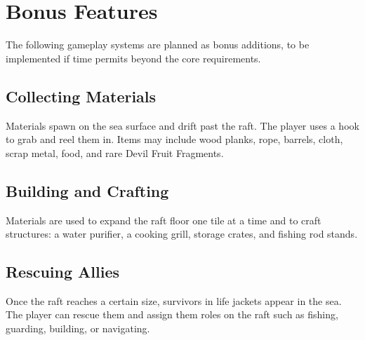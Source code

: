 \documentclass[12pt, a4paper]{article}
\begin{document}
\section{Bonus Features}

The following gameplay systems are planned as bonus additions, to be implemented if time permits beyond the
core requirements.

\subsection{Collecting Materials}
Materials spawn on the sea surface and drift past the raft. The player uses a hook to grab and reel them in.
Items may include wood planks, rope, barrels, cloth, scrap metal, food, and rare Devil Fruit Fragments.

\subsection{Building and Crafting}
Materials are used to expand the raft floor one tile at a time and to craft structures: a water purifier, a
cooking grill, storage crates, and fishing rod stands.

\subsection{Rescuing Allies}
Once the raft reaches a certain size, survivors in life jackets appear in the sea. The player can rescue them
and assign them roles on the raft such as fishing, guarding, building, or navigating.

\end{document}
